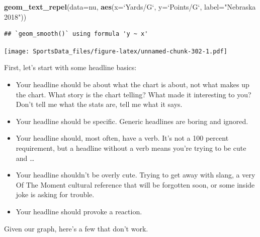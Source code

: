 \documentclass[
]{book}
\newenvironment{Shaded}{\begin{snugshade}}{\end{snugshade}}
\newcommand{\DataTypeTok}[1]{\textcolor[rgb]{0.13,0.29,0.53}{#1}}
\newcommand{\KeywordTok}[1]{\textcolor[rgb]{0.13,0.29,0.53}{\textbf{#1}}}
\newcommand{\NormalTok}[1]{#1}
\newcommand{\StringTok}[1]{\textcolor[rgb]{0.31,0.60,0.02}{#1}}
\providecommand{\tightlist}{%
  \setlength{\itemsep}{0pt}\setlength{\parskip}{0pt}}
\begin{document}
\begin{Shaded}
\begin{Highlighting}[]
\StringTok{  }\KeywordTok{geom_text_repel}\NormalTok{(}\DataTypeTok{data=}\NormalTok{nu, }\KeywordTok{aes}\NormalTok{(}\DataTypeTok{x=}\StringTok{`}\DataTypeTok{Yards/G}\StringTok{`}\NormalTok{, }\DataTypeTok{y=}\StringTok{`}\DataTypeTok{Points/G}\StringTok{`}\NormalTok{, }\DataTypeTok{label=}\StringTok{"Nebraska 2018"}\NormalTok{))}
\end{Highlighting}
\end{Shaded}

\begin{verbatim}
## `geom_smooth()` using formula 'y ~ x'
\end{verbatim}

\texttt{[image: SportsData\_files/figure-latex/unnamed-chunk-302-1.pdf]}

First, let's start with some headline basics:

\begin{itemize}
\tightlist
\item
  Your headline should be about what the chart is about, not what makes up the chart. What story is the chart telling? What made it interesting to you? Don't tell me what the stats are, tell me what it says.
\item
  Your headline should be specific. Generic headlines are boring and ignored.
\item
  Your headline should, most often, have a verb. It's not a 100 percent requirement, but a headline without a verb means you're trying to be cute and \ldots{}
\item
  Your headline shouldn't be overly cute. Trying to get away with slang, a very Of The Moment cultural reference that will be forgotten soon, or some inside joke is asking for trouble.
\item
  Your headline should provoke a reaction.
\end{itemize}

Given our graph, here's a few that don't work.
\end{document}
